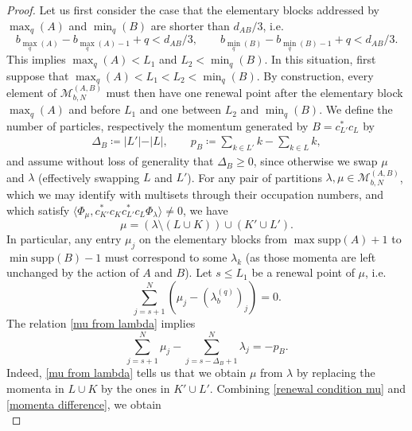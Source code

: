 \documentclass[10pt,a4paper]{amsart}
\begin{document}
\begin{proof}

	Let us first consider the case that the elementary blocks addressed by $ \max_q(A) $ and $ \min_q(B) $ are shorter than $ d_{AB}/3 $, i.e.
	$$
		b_{\max_q(A)}-b_{\max_q(A)-1}+q< d_{AB}/3, \qquad b_{\min_q(B)}-b_{\min_q(B)-1}+q< d_{AB}/3.
	$$
	This implies $\max_q(A)<L_1$ and $L_2<\min_q(B)$. In this situation, first suppose that
	 $\max_q(A)<L_1<L_2<\min_q(B)$. By construction, every element of $\mathcal{M}_{b,N}^{(A,B)}$ must then have one renewal point after the elementary block $\max_q(A) $ and before $L_1$ and one between $L_2 $ and $ \min_q(B)$. 
	 We define the number of particles, respectively the momentum generated by $ B = c_{L'}^* c_L $ by
	\begin{align*}
		\Delta_B \coloneqq \vert L'\vert - \vert L \vert, \qquad p_B \coloneqq \sum_{k\in L'} k - \sum_{k\in L} k, 
	\end{align*}
	and assume without loss of generality  that $\Delta_B\geq 0$, since otherwise we swap $\mu$ and $\lambda$ (effectively swapping $L$ and $L'$). 
	For any  pair of partitions $\lambda, \mu \in \mathcal{M}_{b,N}^{(A,B)}$, which we may identify with multisets through their occupation numbers, and which satisfy
	$
		\langle \Phi_\mu, c_{K'}^* c_K c_{L'}^* c_L \Phi_\lambda \rangle \neq 0 $, 
	we have 
	\begin{equation} \label{mu from lambda}
		\mu = (\lambda\setminus (L\cup K)) \cup (K'\cup L') . 
	\end{equation} 
	In particular, any entry $\mu_j $ on the elementary blocks from $ \max \mathrm{supp}(A)+1 $ to $ \min \mathrm{supp}(B)-1$ must correspond to some $\lambda_k$ (as those momenta are left unchanged by the action of $A$ and $B$). Let $s\leq L_1$ be a renewal point of $\mu$, i.e.
	\begin{equation} \label{renewal condition mu}
		\sum_{j=s+1}^N (\mu_j - (\lambda_b^{(q)})_j) = 0.
	\end{equation}   
	The relation \eqref{mu from lambda} implies
	\begin{equation} \label{momenta difference}
		\sum_{j=s+1}^N \mu_j - \sum_{j=s-\Delta_B+1}^N \lambda_j = -p_B.
	\end{equation}
	Indeed, \eqref{mu from lambda} tells us that we obtain $\mu$ from $\lambda$ by replacing the momenta in $L\cup K$ by the ones in $K'\cup L'$. Combining \eqref{renewal condition mu} and \eqref{momenta difference}, we obtain
	\begin{equation} \label{renewal equation mu}

\end{equation}
\end{proof}
\end{document}
